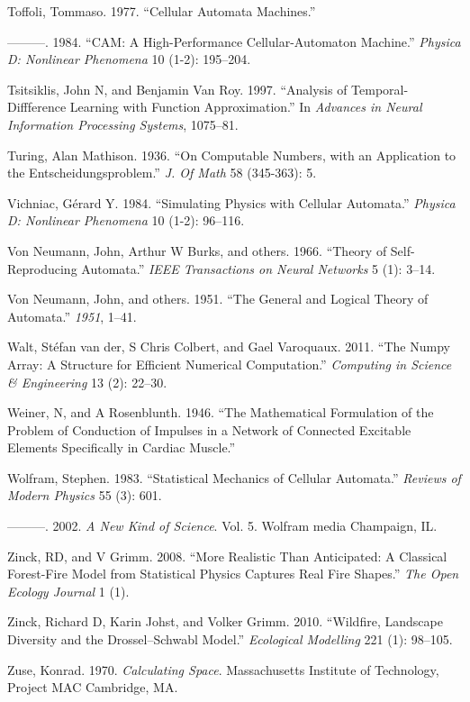 \documentclass[
  openany]{book}
\newlength{\cslhangindent}
\newenvironment{cslreferences}%
  {\setlength{\parindent}{0pt}%
  \everypar{\setlength{\hangindent}{\cslhangindent}}\ignorespaces}%
  {\par}
\begin{document}
\begin{cslreferences}
\leavevmode\hypertarget{ref-toffoli1977cellular}{}%
Toffoli, Tommaso. 1977. ``Cellular Automata Machines.''

\leavevmode\hypertarget{ref-toffoli1984cam}{}%
---------. 1984. ``CAM: A High-Performance Cellular-Automaton Machine.'' \emph{Physica D: Nonlinear Phenomena} 10 (1-2): 195--204.

\leavevmode\hypertarget{ref-tsitsiklis1997analysis}{}%
Tsitsiklis, John N, and Benjamin Van Roy. 1997. ``Analysis of Temporal-Diffference Learning with Function Approximation.'' In \emph{Advances in Neural Information Processing Systems}, 1075--81.

\leavevmode\hypertarget{ref-turing1936computable}{}%
Turing, Alan Mathison. 1936. ``On Computable Numbers, with an Application to the Entscheidungsproblem.'' \emph{J. Of Math} 58 (345-363): 5.

\leavevmode\hypertarget{ref-vichniac1984simulating}{}%
Vichniac, Gérard Y. 1984. ``Simulating Physics with Cellular Automata.'' \emph{Physica D: Nonlinear Phenomena} 10 (1-2): 96--116.

\leavevmode\hypertarget{ref-von1966theory}{}%
Von Neumann, John, Arthur W Burks, and others. 1966. ``Theory of Self-Reproducing Automata.'' \emph{IEEE Transactions on Neural Networks} 5 (1): 3--14.

\leavevmode\hypertarget{ref-von1951general}{}%
Von Neumann, John, and others. 1951. ``The General and Logical Theory of Automata.'' \emph{1951}, 1--41.

\leavevmode\hypertarget{ref-walt2011numpy}{}%
Walt, Stéfan van der, S Chris Colbert, and Gael Varoquaux. 2011. ``The Numpy Array: A Structure for Efficient Numerical Computation.'' \emph{Computing in Science \& Engineering} 13 (2): 22--30.

\leavevmode\hypertarget{ref-weiner1946mathematical}{}%
Weiner, N, and A Rosenblunth. 1946. ``The Mathematical Formulation of the Problem of Conduction of Impulses in a Network of Connected Excitable Elements Specifically in Cardiac Muscle.''

\leavevmode\hypertarget{ref-wolfram1983statistical}{}%
Wolfram, Stephen. 1983. ``Statistical Mechanics of Cellular Automata.'' \emph{Reviews of Modern Physics} 55 (3): 601.

\leavevmode\hypertarget{ref-wolfram2002new}{}%
---------. 2002. \emph{A New Kind of Science}. Vol. 5. Wolfram media Champaign, IL.

\leavevmode\hypertarget{ref-zinck2008more}{}%
Zinck, RD, and V Grimm. 2008. ``More Realistic Than Anticipated: A Classical Forest-Fire Model from Statistical Physics Captures Real Fire Shapes.'' \emph{The Open Ecology Journal} 1 (1).

\leavevmode\hypertarget{ref-zinck2010wildfire}{}%
Zinck, Richard D, Karin Johst, and Volker Grimm. 2010. ``Wildfire, Landscape Diversity and the Drossel--Schwabl Model.'' \emph{Ecological Modelling} 221 (1): 98--105.

\leavevmode\hypertarget{ref-zuse1970calculating}{}%
Zuse, Konrad. 1970. \emph{Calculating Space}. Massachusetts Institute of Technology, Project MAC Cambridge, MA.
\end{cslreferences}
\end{document}
